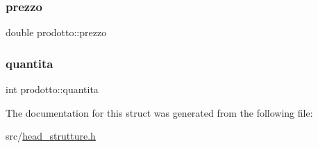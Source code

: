 \mbox{\label{structprodotto_a7ab3f5c685551ed46abb214bc2f43aac}} 
\subsubsection{\texorpdfstring{prezzo}{prezzo}}
{\footnotesize\ttfamily double prodotto\+::prezzo}

\mbox{\label{structprodotto_a534126552a4446bb902bee13404dce29}} 
\subsubsection{\texorpdfstring{quantita}{quantita}}
{\footnotesize\ttfamily int prodotto\+::quantita}



The documentation for this struct was generated from the following file\+:\begin{DoxyCompactItemize}
\item 
src/\hyperlink{head__strutture_8h}{head\+\_\+strutture.\+h}\end{DoxyCompactItemize}

